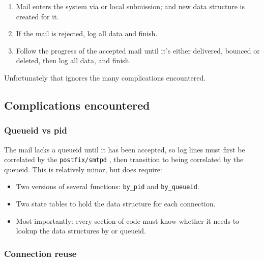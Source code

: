 \documentclass[a4paper,12pt,draft]{article}
\newcommand{\daemon}[1]{%
    \texttt{postfix/#1}%
}
\begin{document}
\begin{enumerate}

    \item Mail enters the system via \SMTP{} or local submission; and new
        data structure is created for it.

    \item If the mail is rejected, log all data and finish.

    \item Follow the progress of the accepted mail until it's either
        delivered, bounced or deleted, then log all data, and finish.

\end{enumerate}

Unfortunately that ignores the many complications encountered.


\subsection{Complications encountered}

\label{complications}


\subsubsection{Queueid vs pid}

The mail lacks a queueid until it has been accepted, so log lines must
first be correlated by the \daemon{smtpd} \pid{}, then transition to being
correlated by the queueid.  This is relatively minor, but does require:

\begin{itemize}

    \item Two versions of several functions: \texttt{by\_pid} and
        \texttt{by\_queueid}.

    \item Two state tables to hold the data structure for each connection.

    \item Most importantly: every section of code must know whether it
        needs to lookup the data structures by \pid{} or queueid.

\end{itemize}

\subsubsection{Connection reuse}
\end{document}
